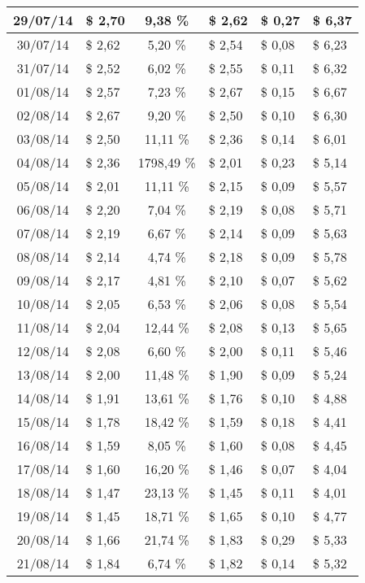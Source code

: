 \begin{center}
\begin{small}
\begin{longtable}{|c|l|c|l|l|l|}
29/07/14 & \$ 2,70 & 9,38 \% & \$ 2,62 & \$ 0,27 & \$ 6,37 \\ \hline
30/07/14 & \$ 2,62 & 5,20 \% & \$ 2,54 & \$ 0,08 & \$ 6,23 \\ \hline
31/07/14 & \$ 2,52 & 6,02 \% & \$ 2,55 & \$ 0,11 & \$ 6,32 \\ \hline
01/08/14 & \$ 2,57 & 7,23 \% & \$ 2,67 & \$ 0,15 & \$ 6,67 \\ \hline
02/08/14 & \$ 2,67 & 9,20 \% & \$ 2,50 & \$ 0,10 & \$ 6,30 \\ \hline
03/08/14 & \$ 2,50 & 11,11 \% & \$ 2,36 & \$ 0,14 & \$ 6,01 \\ \hline
04/08/14 & \$ 2,36 & 1798,49 \% & \$ 2,01 & \$ 0,23 & \$ 5,14 \\ \hline
05/08/14 & \$ 2,01 & 11,11 \% & \$ 2,15 & \$ 0,09 & \$ 5,57 \\ \hline
06/08/14 & \$ 2,20 & 7,04 \% & \$ 2,19 & \$ 0,08 & \$ 5,71 \\ \hline
07/08/14 & \$ 2,19 & 6,67 \% & \$ 2,14 & \$ 0,09 & \$ 5,63 \\ \hline
08/08/14 & \$ 2,14 & 4,74 \% & \$ 2,18 & \$ 0,09 & \$ 5,78 \\ \hline
09/08/14 & \$ 2,17 & 4,81 \% & \$ 2,10 & \$ 0,07 & \$ 5,62 \\ \hline
10/08/14 & \$ 2,05 & 6,53 \% & \$ 2,06 & \$ 0,08 & \$ 5,54 \\ \hline
11/08/14 & \$ 2,04 & 12,44 \% & \$ 2,08 & \$ 0,13 & \$ 5,65 \\ \hline
12/08/14 & \$ 2,08 & 6,60 \% & \$ 2,00 & \$ 0,11 & \$ 5,46 \\ \hline
13/08/14 & \$ 2,00 & 11,48 \% & \$ 1,90 & \$ 0,09 & \$ 5,24 \\ \hline
14/08/14 & \$ 1,91 & 13,61 \% & \$ 1,76 & \$ 0,10 & \$ 4,88 \\ \hline
15/08/14 & \$ 1,78 & 18,42 \% & \$ 1,59 & \$ 0,18 & \$ 4,41 \\ \hline
16/08/14 & \$ 1,59 & 8,05 \% & \$ 1,60 & \$ 0,08 & \$ 4,45 \\ \hline
17/08/14 & \$ 1,60 & 16,20 \% & \$ 1,46 & \$ 0,07 & \$ 4,04 \\ \hline
18/08/14 & \$ 1,47 & 23,13 \% & \$ 1,45 & \$ 0,11 & \$ 4,01 \\ \hline
19/08/14 & \$ 1,45 & 18,71 \% & \$ 1,65 & \$ 0,10 & \$ 4,77 \\ \hline
20/08/14 & \$ 1,66 & 21,74 \% & \$ 1,83 & \$ 0,29 & \$ 5,33 \\ \hline
21/08/14 & \$ 1,84 & 6,74 \% & \$ 1,82 & \$ 0,14 & \$ 5,32 \\ \hline

\end{longtable}
\end{small}
\end{center}
